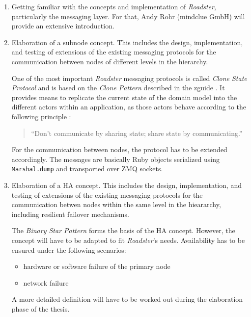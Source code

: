 \documentclass[a4paper]{article}
\newcommand{\rb}[1]{\lstinline[style=customruby]{#1}} %
\begin{document}
\begin{enumerate}
	\item Getting familiar with the concepts and implementation of
		\emph{Roadster}, particularly the messaging layer. For that,
		Andy Rohr (mindclue GmbH) will provide an extensive
		introduction.

	\item Elaboration of a subnode concept. This includes the design,
		implementation, and testing of extensions of the existing
		messaging protocols for the communication between nodes of
		different levels in the hierarchy.

		One of the most important \emph{Roadster} messaging protocols
		is called \emph{Clone State Protocol} and is based on the
		\emph{Clone Pattern} described in the zguide
		\cite{zguide:clone-pattern}. It provides means to replicate the
		current state of the domain model into the different actors
		within an application, as those actors behave according to the
		following principle \cite{igvita:concurrency}:

		\begin{quote}
		``Don't communicate by sharing state; share state by communicating.''
		\end{quote}

		For the communication between nodes, the protocol has to be
		extended accordingly. The messages are basically Ruby objects
		serialized using \rb{Marshal.dump} and transported over ZMQ
		sockets.

	\item Elaboration of a HA concept. This includes the design,
		implementation, and testing of extensions of the existing
		messaging protocols for the communication betwen nodes within
		the same level in the hieararchy, including resilient failover
		mechanisms.

		The \emph{Binary Star Pattern}
		\cite{zguide:binary-star}\cite{zguide:adding-binary-star} forms
		the basis of the HA concept. However, the concept will have to
		be adapted to fit \emph{Roadster}'s needs. Availability has to
		be ensured under the following scenarios:

		\begin{itemize}
			\item hardware or software failure of the primary node
			\item network failure
		\end{itemize}

		A more detailed definition will have to be worked out during
		the elaboration phase of the thesis.


\end{enumerate}
\end{document}
